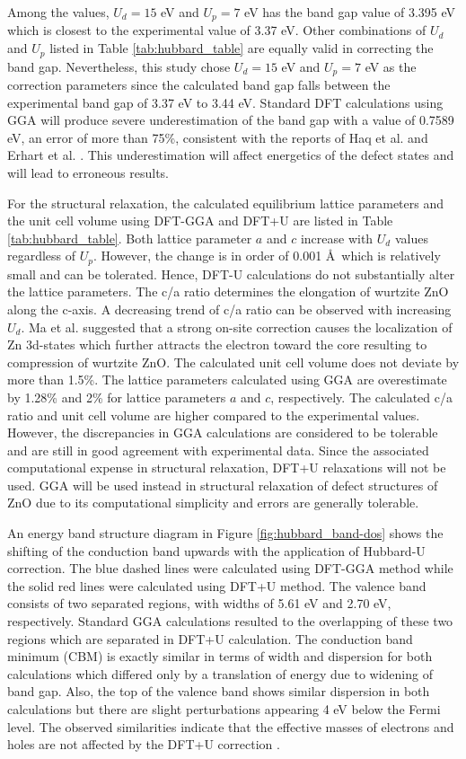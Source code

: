 Among the values, $U_d = 15$ eV and $U_p = 7$ eV has the band gap  value of 3.395 eV which is closest to the experimental value of 3.37 eV. Other combinations of $U_d$ and $U_p$ listed in Table \ref{tab:hubbard_table} are equally valid in correcting the band gap. Nevertheless, this study chose $U_d = 15$ eV and $U_p = 7$ eV as the correction parameters since the calculated band gap falls between the experimental band gap of 3.37 eV to 3.44 eV. Standard DFT calculations using GGA will produce severe underestimation of the band gap with  a value of 0.7589 eV, an error of more than 75\%, consistent with the reports of Haq et al. \citep{Haq2013} and Erhart et al. \citep{Erhart2006a}. This underestimation will affect energetics of the defect states and will lead to erroneous results.

For the structural relaxation, the calculated equilibrium lattice parameters and the unit cell volume  using DFT-GGA and DFT+U are listed in Table \ref{tab:hubbard_table}.  Both lattice parameter $a$ and $c$ increase with $U_d$ values regardless of $U_p$. However, the change is in order of 0.001 \AA \ which is relatively small and can be tolerated. Hence, DFT-U calculations do not substantially alter the lattice parameters. The c/a ratio determines the elongation of wurtzite ZnO along the c-axis. A decreasing trend of c/a ratio can be observed with increasing $U_d$. Ma et al. \citep{Ma2013} suggested that a strong on-site correction causes the localization of Zn 3d-states which further attracts the electron toward the core resulting to  compression of wurtzite ZnO. The calculated unit cell volume does not deviate by more than 1.5\%. The lattice parameters calculated using GGA are overestimate by 1.28\% and 2\% for lattice parameters $a$ and $c$, respectively. The calculated c/a ratio and unit cell volume are higher compared to the experimental values. However, the discrepancies in GGA calculations are considered to be tolerable and are still in good agreement with experimental data. Since the associated computational expense in structural relaxation, DFT+U relaxations will not be used. GGA will be used instead in structural relaxation of defect structures of ZnO  due to its computational simplicity and errors are generally tolerable.

An energy band structure diagram in Figure \ref{fig:hubbard_band-dos} shows the shifting of the conduction band upwards with the application of Hubbard-U correction. The blue dashed lines were calculated using DFT-GGA method while the solid red lines were calculated using DFT+U method.   The valence band consists of two separated regions, with widths of 5.61 eV and 2.70 eV, respectively. Standard GGA calculations resulted to the overlapping of these two regions  which are separated in DFT+U calculation. The conduction band minimum (CBM) is exactly similar in terms of width and dispersion for both calculations which differed only by a translation of energy due to widening of band gap. Also, the top of the valence band shows similar dispersion in both calculations but there are slight perturbations appearing 4 eV below the Fermi level. The observed similarities indicate that the effective masses of electrons and holes  are not affected by the DFT+U correction \citep{Goh2017}.

